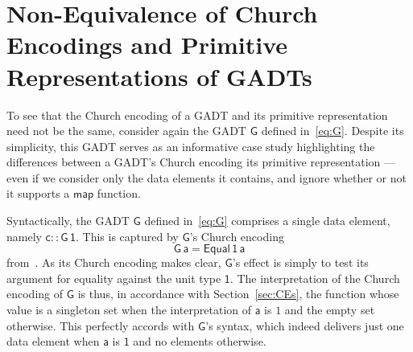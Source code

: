 \documentclass[acmsmall,screen,review,anonymous]{acmart}
\theoremstyle{definition}
\begin{document}
\section{Non-Equivalence of Church Encodings and Primitive
  Representations of GADTs}\label{sec:non-equiv}

To see that the Church encoding of a GADT and its primitive
representation need not be the same, consider again the GADT
$\mathsf{G}$ defined in~\eqref{eq:G}. Despite its simplicity, this
GADT serves as an informative case study highlighting the differences
between a GADT's Church encoding its primitive representation --- even
if we consider only the data elements it contains, and ignore whether
or not it supports a $\mathsf{map}$ function.

\begin{example}\label{ex:g1}
Syntactically, the GADT $\mathsf{G}$ defined in~\eqref{eq:G} comprises
a single data element, namely $\mathsf{c :: G \, 1}$. This is captured
by $\mathsf{G}$'s Church encoding
\[\mathsf{G\,a} = \mathsf{Equal\,1\,a}\]
from~\cite{atk12}. As its Church encoding makes clear, $\mathsf{G}$'s
effect is simply to test its argument for equality against the unit
type $\mathsf{1}$. The interpretation of the Church encoding of
$\mathsf{G}$ is thus, in accordance with Section~\ref{sec:CEs}, the
function whose value is a singleton set when the interpretation of
$\mathsf{a}$ is $1$ and the empty set otherwise. This perfectly
accords with $\mathsf{G}$'s syntax, which indeed delivers just one
data element when $\mathsf{a}$ is $\mathsf{1}$ and no elements
otherwise.


\end{example}
\end{document}
